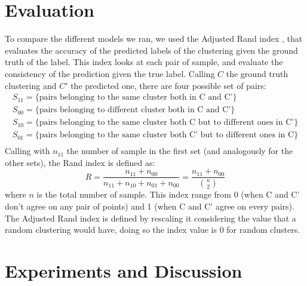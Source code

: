\documentclass[]{article}
\begin{document}
	\section{Evaluation}
	To compare the different models we ran, we used the Adjusted Rand index \cite{rand},  that evaluates the accuracy of the predicted labels of the clustering given the ground truth of the label. 
	This index looks at each pair of sample, and evaluate the consistency of the prediction given the true label. Calling $C$ the ground truth clustering and $C'$ the predicted one, there are four possible set of pairs:
	$$
	\begin{array}{ll}
	S_{11} = \{\text{pairs belonging to the same cluster both in C and C'} \}\\
	S_{00} =  \{\text{pairs belonging to different cluster both in C and C'} \}\\
	S_{10} =  \{\text{pairs belonging to the same cluster both C but to different ones in C'} \}\\
	S_{01} =  \{\text{pairs belonging to the same cluster both C' but to different ones in C} \}\\
	\end{array}
	$$
	Calling with $n_{11}$ the number of sample in the first set (and analogously for the other sets), the Rand index is defined as:
	$$
	R=\frac{n_{11}+n_{00}}{n_{11}+n_{10}+n_{01}+n_{00}} = \frac{n_{11}+n_{00}}{{ n\choose 2}}
	$$
	where $n$ is the total number of sample. This index range from 0 (when C and C' don't agree on any pair of points) and 1 (when C and C' agree on every pairs). The Adjusted Rand index is defined by rescaling it considering the value that a random clustering would have, doing so the index value is 0 for random clusters. 
	
	\section{Experiments and Discussion}

\end{document}

